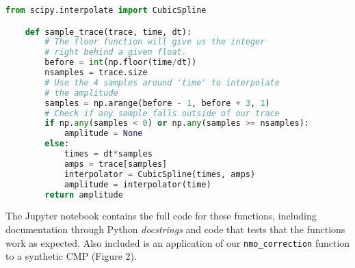 \begin{lstlisting}[language=python]
    from scipy.interpolate import CubicSpline

    def sample_trace(trace, time, dt):
        # The floor function will give us the integer
        # right behind a given float.
        before = int(np.floor(time/dt))
        nsamples = trace.size
        # Use the 4 samples around 'time' to interpolate
        # the amplitude
        samples = np.arange(before - 1, before + 3, 1)
        # Check if any sample falls outside of our trace
        if np.any(samples < 0) or np.any(samples >= nsamples):
            amplitude = None
        else:
            times = dt*samples
            amps = trace[samples]
            interpolator = CubicSpline(times, amps)
            amplitude = interpolator(time)
        return amplitude
\end{lstlisting}

The Jupyter notebook contains the full code for these functions, including
documentation through Python \textit{docstrings} and code that tests that the
functions work as expected.
Also included is an application of our \texttt{nmo\_correction} function to a
synthetic CMP (Figure 2).
